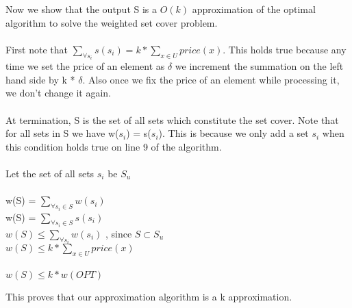 \documentclass[11pt]{article}
\begin{document}
Now we show that the output S is a $O(k)$ approximation of the optimal algorithm to solve the weighted set cover problem.\\\\
First note that $\sum\limits_{\forall s_i} s(s_i) = k *  \sum\limits_{x \in U} price(x)$. This holds true because any time we set the price of an element as $\delta$ we increment the summation on the left hand side by k * $\delta$. Also once we fix the price of an element while processing it, we don't change it again.\\\\
At termination, S is the set of all sets which constitute the set cover. Note that for all sets in S we have w($s_i$) = s($s_i$). This is because we only add a set $s_i$ when this condition holds true on line 9 of the algorithm.\\\\
Let the set of all sets $s_i$ be $S_u$\\\\
w(S) = $\sum\limits_{\forall s_i \in S} w(s_i)$\\
w(S) = $\sum\limits_{\forall s_i \in S} s(s_i)$\\ 
$w(S) \leq \sum\limits_{\forall s_i } w(s_i)$ , since $S\subset S_u$\\
$w(S) \leq k *  \sum\limits_{x \in U} price(x)$\\\\
$w(S) \leq k *  w(OPT)$


This proves that our approximation algorithm is a k approximation.
\end{document}
